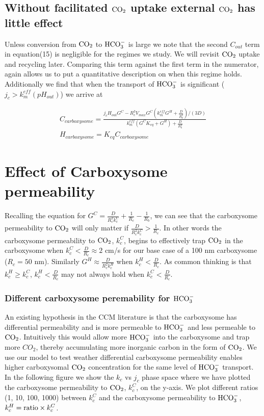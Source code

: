 \documentclass[]{article}
\begin{document}
\subsection{Without facilitated ${\rm CO_2}$ uptake external ${\rm CO_2}$ has little effect}

Unless conversion from ${\rm CO_2}$ to ${\rm HCO_3^-}$ is large we note that the second $C_{out}$ term in equation(15) is negligible for the regimes we study. We will revisit ${\rm CO_2}$ uptake and recycling later. Comparing this term against the first term in the numerator, again allows us to put a quantitative description on when this regime holds. Additionally we find that when the transport of ${\rm HCO_3^-}$ is significant ($j_c > k_m^{eff}(pH_{out})$) we arrive at

\begin{eqnarray}
	C_{carboxysome} = \frac{j_c H_{out}G^C - R_c^3 V_{max}G^C(k_m^{eff} G^H + \frac{D}{R_b^2})/(3D)}
	{k_m^{eff}(G^C K_{eq} +  G^H) + \frac{D}{R_b^2} }\\
	H_{carboxysome} = K_{eq} C_{carboxysome}
\end{eqnarray}

\section{Effect of Carboxysome permeability}

Recalling the equation for $G^C = \frac{D}{R_c^2 k_c^C} + \frac{1}{R_c}-\frac{1}{R_b}$, we can see that the carboxysome permeability to  ${\rm CO_2}$ will only matter if $ \frac{D}{R_c^2 k_c^C} >\frac{1}{R_c}$. In other words the carboxysome permeability to ${\rm CO_2}$, $k_c^C$, begins to effectively trap ${\rm CO_2}$ in the carboxysome when $k_c^C < \frac{D}{R_c} \approx 2$ cm/s for our base case of a 100 nm carboxysome ($R_c = 50$ nm). Similarly $G^H \approx \frac{D}{R_c^2 k_c^H}$ when $k_c^H < \frac{D}{R_c}$. As common thinking is that $k_c^H \geq k_c^C$,  $k_c^H < \frac{D}{R_c}$ may not always hold when  $k_c^C < \frac{D}{R_c}$. 

\subsubsection{Different carboxysome peremability for ${\rm HCO_3^-}$}
An existing hypothesis in the CCM literature is that the carboxysome has differential permeability and is more permeable to ${\rm HCO_3^-}$ and less permeable to ${\rm CO_2}$. Intuitively this would allow more ${\rm HCO_3^-}$ into the carboxysome and trap more ${CO_2}$, thereby accumulating more inorganic carbon in the form of ${\rm CO_2}$. We use our model to test weather differential carboxysome permeability enables higher carboxysomal ${\rm CO_2}$ concentration for the same level of ${\rm HCO_3^-}$ transport. In the following figure we show the $k_c$ vs $j_c$ phase space where we have plotted the carboxysome permeability to ${\rm CO_2}$, $k_c^C$, on the y-axis. We plot different ratios (1, 10, 100, 1000) between $k_c^C$ and the carboxysome permeability to ${\rm HCO_3^-}$, $k_c^H = {\rm ratio} \times k_c^C$. 
\end{document}
